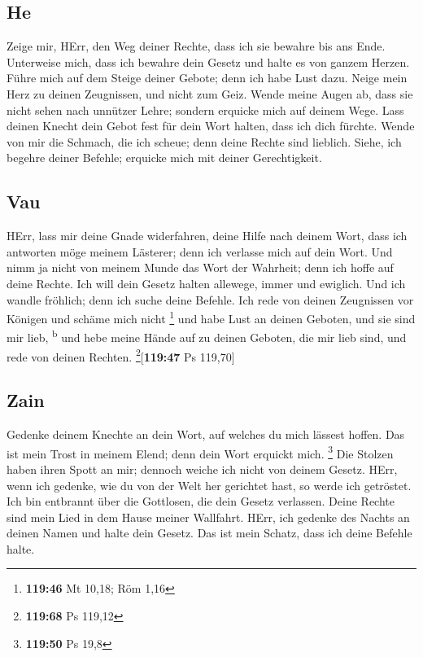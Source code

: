 \hypertarget{he}{%
\subsection{He}\label{he}}

 Zeige mir, HErr, den Weg deiner Rechte, dass ich sie
bewahre bis ans Ende.  Unterweise mich, dass ich bewahre
dein Gesetz und halte es von ganzem Herzen.  Führe mich
auf dem Steige deiner Gebote; denn ich habe Lust dazu. 
Neige mein Herz zu deinen Zeugnissen, und nicht zum Geiz.
 Wende meine Augen ab, dass sie nicht sehen nach unnützer
Lehre; sondern erquicke mich auf deinem Wege.  Lass
deinen Knecht dein Gebot fest für dein Wort halten, dass ich dich
fürchte.  Wende von mir die Schmach, die ich scheue; denn
deine Rechte sind lieblich.  Siehe, ich begehre deiner
Befehle; erquicke mich mit deiner Gerechtigkeit.

\hypertarget{vau}{%
\subsection{Vau}\label{vau}}

 HErr, lass mir deine Gnade widerfahren, deine Hilfe nach
deinem Wort,  dass ich antworten möge meinem Lästerer;
denn ich verlasse mich auf dein Wort.  Und nimm ja nicht
von meinem Munde das Wort der Wahrheit; denn ich hoffe auf deine Rechte.
 Ich will dein Gesetz halten allewege, immer und
ewiglich.  Und ich wandle fröhlich; denn ich suche deine
Befehle.  Ich rede von deinen Zeugnissen vor Königen und
schäme mich nicht \footnote{\textbf{119:46} Mt 10,18; Röm 1,16}
 und habe Lust an deinen Geboten, und sie sind mir lieb,
\textsuperscript{b}  und hebe meine Hände auf zu deinen
Geboten, die mir lieb sind, und rede von deinen Rechten.
\footnote{\textbf{119:68} Ps 119,12}{[}\textbf{119:47} Ps 119,70{]}

\hypertarget{zain}{%
\subsection{Zain}\label{zain}}

 Gedenke deinem Knechte an dein Wort, auf welches du mich
lässest hoffen.  Das ist mein Trost in meinem Elend; denn
dein Wort erquickt mich. \footnote{\textbf{119:50} Ps 19,8}
 Die Stolzen haben ihren Spott an mir; dennoch weiche ich
nicht von deinem Gesetz.  HErr, wenn ich gedenke, wie du
von der Welt her gerichtet hast, so werde ich getröstet. 
Ich bin entbrannt über die Gottlosen, die dein Gesetz verlassen.
 Deine Rechte sind mein Lied in dem Hause meiner
Wallfahrt.  HErr, ich gedenke des Nachts an deinen Namen
und halte dein Gesetz.  Das ist mein Schatz, dass ich
deine Befehle halte.

